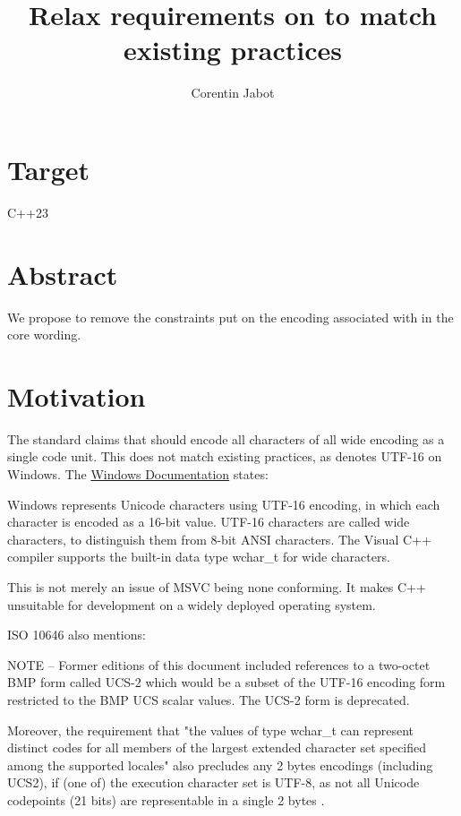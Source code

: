 \documentclass{wg21}
\title{Relax requirements on \tcode{wchar\_t} to match existing practices}
\author{Corentin Jabot}{corentin.jabot@gmail.com}
\begin{document}
\maketitle

\section{Target}

C++23

\section{Abstract}

We propose to remove the constraints put on the encoding associated with  in the core wording.

\section{Motivation}

The standard claims that  should encode all characters of all wide encoding
as a single code unit.
This does not match existing practices, as  denotes UTF-16 on Windows.
The \href{https://docs.microsoft.com/en-us/windows/win32/learnwin32/working-with-strings}{Windows Documentation} states:

\begin{quoteblock}
Windows represents Unicode characters using UTF-16 encoding, in which each character is encoded as a 16-bit value. UTF-16 characters are called wide characters, to distinguish them from 8-bit ANSI characters. The Visual C++ compiler supports the built-in data type wchar_t for wide characters.
\end{quoteblock}

This is not merely an issue of MSVC being none conforming.
It makes C++ unsuitable for development on a widely deployed operating system.


ISO 10646 also mentions:

\begin{quoteblock}
NOTE – Former editions of this document included references to a two-octet BMP form called UCS-2 which would be a subset of the
UTF-16  encoding form restricted to the BMP UCS scalar values. The UCS-2 form is deprecated.
\end{quoteblock}

Moreover, the requirement that "the values of type wchar_t can represent distinct codes for all
members of the largest extended character set specified among the supported locales" also precludes any 2 bytes encodings (including UCS2),
if (one of) the execution character set is UTF-8, as not all Unicode codepoints (21 bits) are representable in a single 2 bytes .
\end{document}
